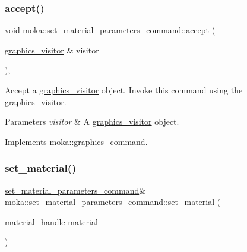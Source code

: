 \subsubsection{\texorpdfstring{accept()}{accept()}}
{\footnotesize\ttfamily void moka\+::set\+\_\+material\+\_\+parameters\+\_\+command\+::accept (\begin{DoxyParamCaption}\item[{\mbox{\hyperlink{classmoka_1_1graphics__visitor}{graphics\+\_\+visitor}} \&}]{visitor }\end{DoxyParamCaption})\hspace{0.3cm}{\ttfamily [override]}, {\ttfamily [virtual]}}



Accept a \mbox{\hyperlink{classmoka_1_1graphics__visitor}{graphics\+\_\+visitor}} object. Invoke this command using the \mbox{\hyperlink{classmoka_1_1graphics__visitor}{graphics\+\_\+visitor}}. 


\begin{DoxyParams}{Parameters}
{\em visitor} & A \mbox{\hyperlink{classmoka_1_1graphics__visitor}{graphics\+\_\+visitor}} object. \\
\hline
\end{DoxyParams}


Implements \mbox{\hyperlink{classmoka_1_1graphics__command_a7affaeceb1019ab358c62185bce4e654}{moka\+::graphics\+\_\+command}}.

\mbox{\label{classmoka_1_1set__material__parameters__command_a94146b37e0add82e19ca6dd254d02fed}} 
\subsubsection{\texorpdfstring{set\_material()}{set\_material()}}
{\footnotesize\ttfamily \mbox{\hyperlink{classmoka_1_1set__material__parameters__command}{set\+\_\+material\+\_\+parameters\+\_\+command}}\& moka\+::set\+\_\+material\+\_\+parameters\+\_\+command\+::set\+\_\+material (\begin{DoxyParamCaption}\item[{\mbox{\hyperlink{structmoka_1_1material__handle}{material\+\_\+handle}}}]{material }\end{DoxyParamCaption})}



